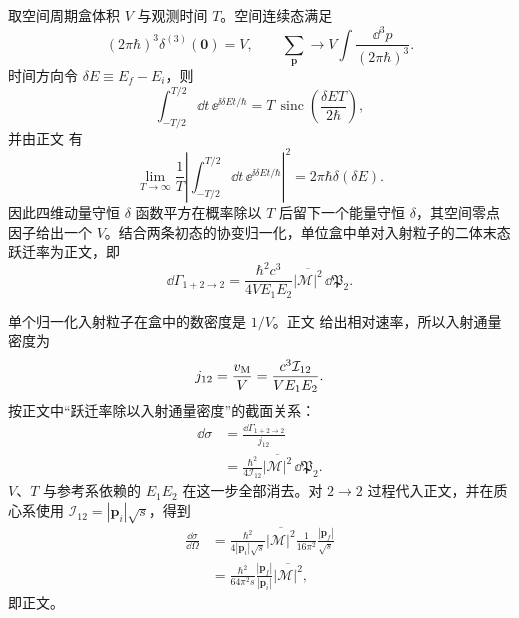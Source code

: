 \begin{derivation}

取空间周期盒体积 $V$ 与观测时间 $T$。空间连续态满足
\begin{equation*}
 (2\pi\hbar)^3\delta^{(3)}(\mathbf0)=V,
 \qquad
 \sum_{\mathbf p}\longrightarrow
 V\int\frac{\dd^3 p}{(2\pi\hbar)^3}.
\end{equation*}
时间方向令 $\delta E\equiv E_f-E_i$，则
\begin{equation*}
 \int_{-T/2}^{T/2}\dd t\,\ee^{\ii\delta E t/\hbar}
 =T\,\operatorname{sinc}\!\left(\frac{\delta E T}{2\hbar}\right),
\end{equation*}
并由正文 有
\begin{equation*}
 \lim_{T\to\infty}\frac1T
 \left|\int_{-T/2}^{T/2}\dd t\,\ee^{\ii\delta E t/\hbar}\right|^2
 =2\pi\hbar\delta(\delta E).
\end{equation*}
因此四维动量守恒 $\delta$ 函数平方在概率除以 $T$ 后留下一个能量守恒 $\delta$，其空间零点因子给出一个 $V$。结合两条初态的协变归一化，单位盒中单对入射粒子的二体末态跃迁率为正文，即
\begin{equation*}
 \dd\Gamma_{1+2\to2}
 =\frac{\hbar^2c^3}{4VE_1E_2}
 \overline{|\mathcal M|^2}\,\dd\mathfrak P_2.
\end{equation*}

单个归一化入射粒子在盒中的数密度是 $1/V$。正文 给出相对速率，所以入射通量密度为
\begin{equation*}
 j_{12}=\frac{v_{\rm M}}{V}
 =\frac{c^3\mathcal I_{12}}{VE_1E_2}.
\end{equation*}
按正文中“跃迁率除以入射通量密度”的截面关系：
\begin{align*}
 \dd\sigma
 &=\frac{\dd\Gamma_{1+2\to2}}{j_{12}}\\
 &=\frac{\hbar^2}{4\mathcal I_{12}}
 \overline{|\mathcal M|^2}\,\dd\mathfrak P_2.
\end{align*}
$V$、$T$ 与参考系依赖的 $E_1E_2$ 在这一步全部消去。对 $2\to2$ 过程代入正文，并在质心系使用
$\mathcal I_{12}=|\mathbf p_i|\sqrt s$，得到
\begin{align*}
 \frac{\dd\sigma}{\dd\Omega}
 &=\frac{\hbar^2}{4|\mathbf p_i|\sqrt s}
 \overline{|\mathcal M|^2}
 \frac1{16\pi^2}\frac{|\mathbf p_f|}{\sqrt s}\\
 &=\frac{\hbar^2}{64\pi^2s}
 \frac{|\mathbf p_f|}{|\mathbf p_i|}
 \overline{|\mathcal M|^2},
\end{align*}
即正文。
\end{derivation}

